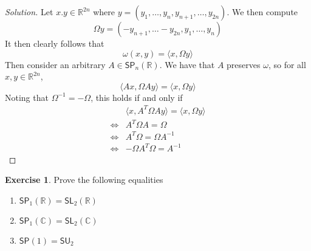 \documentclass[psamsfonts]{amsart}
\theoremstyle{definition}
\newtheorem{exer}[thm]{Exercise}
\theoremstyle{remark}
\newcommand{\R}{\mathbb{R}}
\newcommand{\C}{\mathbb{C}}
\newcommand{\SL}{\mathsf{SL}}
\newcommand{\SP}{\mathsf{SP}}
\newcommand{\SU}{\mathsf{SU}}
\newcommand{\inv}{^{-1}}
\begin{document}
\begin{proof}[Solution]
Let $x.y \in \R^{2n}$ where $y = (y_1, \ldots, y_n, y_{n+1}, \ldots, y_{2n})$. We then compute
$$\Omega y = (-y_{n+1}, \ldots -y_{2n}, y_1, \ldots, y_n) $$
It then clearly follows that 
$$\omega(x,y) = \langle x, \Omega y \rangle $$
Then consider an arbitrary $A \in \SP_n(\R)$. We have that $A$ preserves $\omega$, so for all $x,y \in \R^{2n}$,
$$\langle Ax, \Omega Ay \rangle = \langle x, \Omega y \rangle $$ Noting that $\Omega\inv = -\Omega$, this holds if and only if 
\begin{align*}
&\langle x, A^T\Omega A y \rangle = \langle x, \Omega y \rangle \\
\iff & A^T \Omega A = \Omega \\
\iff & A^T\Omega = \Omega A\inv \\
\iff &-\Omega A^T \Omega = A\inv
\end{align*}
\end{proof}

\begin{exer}
Prove the following equalities
\begin{enumerate}
\item $\SP_1(\R) = \SL_2(\R)$
\item $\SP_1(\C) = \SL_2(\C)$
\item $\SP(1) = \SU_2$
\end{enumerate}
\end{exer}
\end{document}
